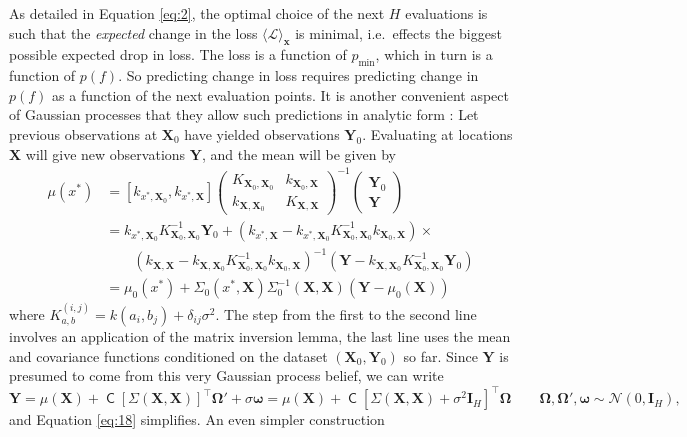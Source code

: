 \documentclass[twoside,11pt]{article}
\renewcommand{\L}{\mathcal{L}}
\newcommand{\N}{\mathcal{N}}
\newcommand{\Trans}{^{\intercal}}
\newcommand{\vx}{\vec{x}}
\newcommand{\vY}{\vec{Y}}
\newcommand{\vX}{\vec{X}}
\newcommand{\pmin}{p_{\min}}
\renewcommand{\vec}{\boldsymbol}
\newcommand{\Id}{\vec{I}}
\newcommand{\chol}{\operatorname{\mathsf{C}}}
\begin{document}
As detailed in Equation \eqref{eq:2}, the optimal choice of the next
$H$ evaluations is such that the \emph{expected} change in the loss
$\langle \L \rangle_{\vx}$ is minimal, i.e.\ effects the biggest
possible expected drop in loss. The loss is a function of $\pmin$,
which in turn is a function of $p(f)$. So predicting change in loss
requires predicting change in $p(f)$ as a function of the next
evaluation points. It is another convenient aspect of Gaussian
processes that they allow such predictions in analytic form
\citep{GaussianRL}: Let previous observations at $\vX_0$ have yielded
observations $\vY_0$. Evaluating at locations $\vX$ will give new
observations $\vY$, and the mean will be given by
\begin{equation}
  \label{eq:18}
  \begin{aligned}
    \mu(x^*) &= [k_{x^*,\vX_0}, k_{x^*,\vX}]
    \begin{pmatrix}
      K_{\vX_0,\vX_0} & k_{\vX_0,\vX} \\ k_{\vX,\vX_0} & K_{\vX,\vX}
    \end{pmatrix}^{-1}
    \begin{pmatrix}
      \vY_0 \\ \vY
    \end{pmatrix} \\
    &= k_{x^*,\vX_0}K^{-1} _{\vX_0,\vX_0} \vY_0 + (k_{x^*,\vX} -
    k_{x^*,\vX_0} K^{-1} _{\vX_0,\vX_0} k_{\vX_0,\vX}) \times \\ &
    \qquad (k_{\vX,\vX} - k_{\vX,\vX_0} K^{-1} _{\vX_0,\vX_0}
    k_{\vX_0,\vX})^{-1}
    (\vY - k_{\vX,\vX_0} K^{-1} _{\vX_0,\vX_0} \vY_0)\\
    & = \mu_0(x^*) + \Sigma_0(x^*,\vX) \Sigma^{-1} _0 (\vX,\vX) (\vY -
    \mu_0(\vX))
 \end{aligned}
\end{equation}
where $K_{a,b} ^{(i,j)} = k(a_i,b_j) + \delta_{ij} \sigma^2$. The step
from the first to the second line involves an application of the
matrix inversion lemma, the last line uses the mean and covariance
functions conditioned on the dataset $(\vX_0,\vY_0)$ so far. Since
$\vY$ is presumed to come from this very Gaussian process belief, we
can write
\begin{equation}
  \label{eq:20}
\vY = \mu(\vX) +
\chol[\Sigma(\vX,\vX)]\Trans \vec{\Omega}' + \sigma\vec{\omega} = \mu(\vX) +
\chol[\Sigma(\vX,\vX) + \sigma^2 \Id_H]\Trans\vec\Omega \qquad
\vec\Omega,\vec\Omega',\vec{\omega} \sim \N(0,\Id_H),
\end{equation}
and Equation \eqref{eq:18} simplifies. An even simpler construction
\end{document}

